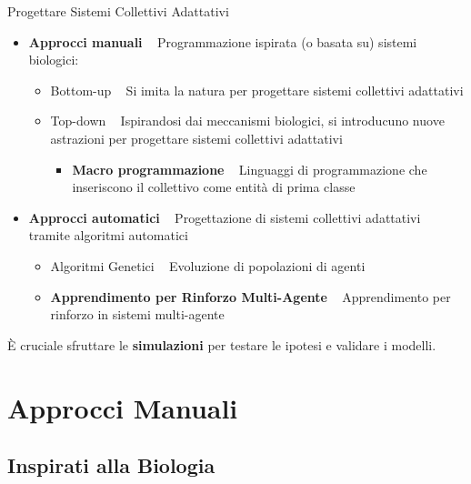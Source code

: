 \documentclass[presentation, 10pt,aspectratio=169]{beamer}\mode<presentation>{\usetheme{AMSBolognaFC}}
\begin{document}
\begin{frame}{Progettare Sistemi Collettivi Adattativi}
	\begin{itemize}
		\item \textbf{Approcci manuali} \faArrowRight ~ Programmazione ispirata (o basata su) sistemi biologici:
		\begin{itemize}
			\item \alert{Bottom-up} \faArrowRight ~ Si imita la natura per progettare sistemi collettivi adattativi
			\item \alert{Top-down} \faArrowRight ~ Ispirandosi dai meccanismi biologici, si introducuno nuove astrazioni per progettare sistemi collettivi adattativi
			\begin{itemize}
				\item \textbf{Macro programmazione} \faArrowRight ~ Linguaggi di programmazione che inseriscono il collettivo come entità di prima classe
			\end{itemize}
		\end{itemize}
		\item \textbf{Approcci automatici} \faArrowRight ~ Progettazione di sistemi collettivi adattativi tramite algoritmi automatici
		\begin{itemize}
			\item \alert{Algoritmi Genetici} \faArrowRight ~ Evoluzione di popolazioni di agenti
			\item \textbf{Apprendimento per Rinforzo Multi-Agente} \faArrowRight ~ Apprendimento per rinforzo in sistemi multi-agente
		\end{itemize}
	\end{itemize}

	È cruciale sfruttare le \alert{\textbf{simulazioni}} per testare le ipotesi e validare i modelli.
\end{frame}
\section{Approcci Manuali}


\subsection{Inspirati alla Biologia}
\end{document}
